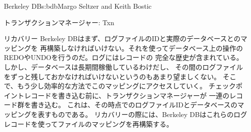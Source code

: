 \begin{aosachapter}{Berkeley DB}{s:bdb}{Margo Seltzer and Keith Bostic}
\begin{aosasect1}{トランザクションマネージャー: Txn}
\begin{aosasect2}{リカバリー}
Berkeley DBはまず、ログファイルのIDと実際のデータベースとのマッピングを
再構築しなければいけない。それを使ってデータベース上の操作の
REDOやUNDOを行うのだ。ログにはレコードの
完全な歴史が含まれている。しかし、データベースは長期間稼働しているわけだし、
その間のログファイルをずっと残しておかなければいけないというのもあまり望ましくない。
そこで、もう少し効率的な方法でこのマッピングにアクセスしていく。
チェックポイントレコードを書き込む前に、トランザクションマネージャーが
一連のレコード群を書き込む。
これは、その時点でのログファイルIDとデータベースのマッピングを表すものである。
リカバリーの際には、Berkeley DBはこれらのログレコードを使ってファイルのマッピングを再構築する。


\end{aosasect2}
\end{aosasect1}
\end{aosachapter}
